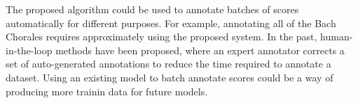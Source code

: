 
The proposed algorithm could be used to annotate batches of
scores automatically for different purposes. For example,
annotating all of the Bach Chorales requires approximately
 using the proposed system.
In the past, human-in-the-loop methods have been proposed,
where an expert annotator corrects a set of auto-generated
annotations to reduce the time required to annotate a
dataset. Using an existing model to batch annotate scores
could be a way of producing more trainin data for future
models.
